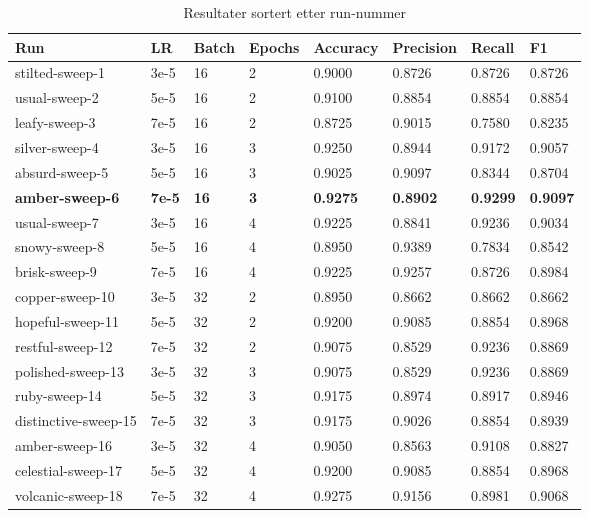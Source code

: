 \begin{table}
\caption{Resultater sortert etter run-nummer}
\label{tab:results}
\begin{tabular}{llllllll}
\toprule
Run & LR & Batch & Epochs & Accuracy & Precision & Recall & F1 \\
\midrule
stilted-sweep-1 & 3e-5 & 16 & 2 & 0.9000 & 0.8726 & 0.8726 & 0.8726 \\
usual-sweep-2 & 5e-5 & 16 & 2 & 0.9100 & 0.8854 & 0.8854 & 0.8854 \\
leafy-sweep-3 & 7e-5 & 16 & 2 & 0.8725 & 0.9015 & 0.7580 & 0.8235 \\
silver-sweep-4 & 3e-5 & 16 & 3 & 0.9250 & 0.8944 & 0.9172 & 0.9057 \\
absurd-sweep-5 & 5e-5 & 16 & 3 & 0.9025 & 0.9097 & 0.8344 & 0.8704 \\
\textbf{amber-sweep-6} & \textbf{7e-5} & \textbf{16} & \textbf{3} & \textbf{0.9275} & \textbf{0.8902} & \textbf{0.9299} & \textbf{0.9097} \\
usual-sweep-7 & 3e-5 & 16 & 4 & 0.9225 & 0.8841 & 0.9236 & 0.9034 \\
snowy-sweep-8 & 5e-5 & 16 & 4 & 0.8950 & 0.9389 & 0.7834 & 0.8542 \\
brisk-sweep-9 & 7e-5 & 16 & 4 & 0.9225 & 0.9257 & 0.8726 & 0.8984 \\
copper-sweep-10 & 3e-5 & 32 & 2 & 0.8950 & 0.8662 & 0.8662 & 0.8662 \\
hopeful-sweep-11 & 5e-5 & 32 & 2 & 0.9200 & 0.9085 & 0.8854 & 0.8968 \\
restful-sweep-12 & 7e-5 & 32 & 2 & 0.9075 & 0.8529 & 0.9236 & 0.8869 \\
polished-sweep-13 & 3e-5 & 32 & 3 & 0.9075 & 0.8529 & 0.9236 & 0.8869 \\
ruby-sweep-14 & 5e-5 & 32 & 3 & 0.9175 & 0.8974 & 0.8917 & 0.8946 \\
distinctive-sweep-15 & 7e-5 & 32 & 3 & 0.9175 & 0.9026 & 0.8854 & 0.8939 \\
amber-sweep-16 & 3e-5 & 32 & 4 & 0.9050 & 0.8563 & 0.9108 & 0.8827 \\
celestial-sweep-17 & 5e-5 & 32 & 4 & 0.9200 & 0.9085 & 0.8854 & 0.8968 \\
volcanic-sweep-18 & 7e-5 & 32 & 4 & 0.9275 & 0.9156 & 0.8981 & 0.9068 \\
\bottomrule
\end{tabular}
\end{table}
